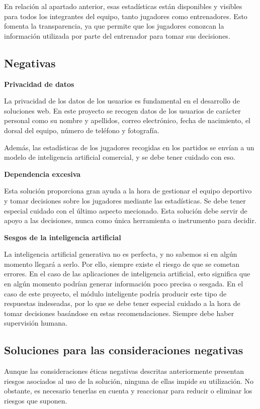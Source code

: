 En relación al apartado anterior, esas estadísticas están disponibles y visibles para todos los integrantes del equipo, tanto jugadores como entrenadores. Esto fomenta la transparencia, ya que permite que los jugadores conozcan la información utilizada por parte del entrenador para tomar sus decisiones.

\subsection{Negativas}

\textbf{Privacidad de datos}

La privacidad de los datos de los usuarios es fundamental en el desarrollo de soluciones web. En este proyecto se recogen datos de los usuarios de carácter personal como su nombre y apellidos, correo electrónico, fecha de nacimiento, el dorsal del equipo, número de teléfono y fotografía.

Además, las estadísticas de los jugadores recogidas en los partidos se envían a un modelo de inteligencia artificial comercial, y se debe tener cuidado con eso.

\textbf{Dependencia excesiva}

Esta solución proporciona gran ayuda a la hora de gestionar el equipo deportivo y tomar decisiones sobre los jugadores mediante las estadísticas. Se debe tener especial cuidado con el último aspecto mecionado. Esta solución debe servir de apoyo a las decisiones, nunca como única herramienta o instrumento para decidir.

\textbf{Sesgos de la inteligencia artificial}

La inteligencia artificial generativa no es perfecta, y no sabemos si en algún momento llegará a serlo. Por ello, siempre existe el riesgo de que se cometan errores. En el caso de las aplicaciones de inteligencia artificial, esto significa que en algún momento podrían generar información poco precisa o sesgada. En el caso de este proyecto, el módulo inteligente podría producir este tipo de respuestas indeseadas, por lo que se debe tener especial cuidado a la hora de tomar decisiones basándose en estas recomendaciones. Siempre debe haber supervisión humana.

\subsection{Soluciones para las consideraciones negativas}

Aunque las consideraciones éticas negativas descritas anteriormente presentan riesgos asociados al uso de la solución, ninguna de ellas impide su utilización. No obstante, es necesario tenerlas en cuenta y reaccionar para reducir o eliminar los riesgos que suponen.

